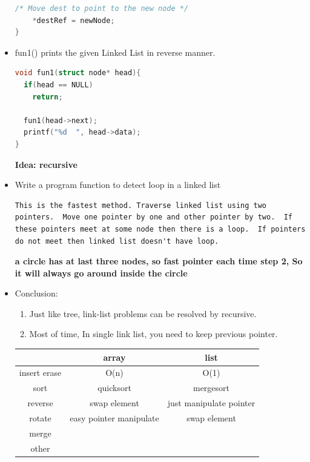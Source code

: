 \documentclass[a4paper,12pt,twoside]{book}
\begin{document}
\begin{itemize}
\begin{lstlisting}[frame=single, language=c++]
    /* Move dest to point to the new node */
    *destRef = newNode;
}
\end{lstlisting}

\item fun1() prints the given Linked List in reverse manner. 
\begin{lstlisting}[frame=single, language=c++]
void fun1(struct node* head){
  if(head == NULL)
    return;
  
  fun1(head->next);
  printf("%d  ", head->data);
}
\end{lstlisting}
\textbf{Idea: recursive}



\item Write a program function to detect loop in a linked list
\begin{lstlisting}[breaklines]
This is the fastest method. Traverse linked list using two pointers.  Move one pointer by one and other pointer by two.  If these pointers meet at some node then there is a loop.  If pointers do not meet then linked list doesn't have loop.
\end{lstlisting}
\textbf{a circle has at last three nodes, so fast pointer each time step 2, So it will always go around inside the circle}

\item Conclusion:
\begin{enumerate}
\item Just like tree, link-list problems can be resolved by recursive. 
\item Most of time, In single link list, you need to keep previous pointer. 
\end{enumerate}

\begin{tabular}{|c|c|c|}
\hline 
 & array & list \\ 
\hline 
insert erase & O(n) & O(1) \\ 
\hline 
sort & quicksort & mergesort  \\ 
\hline 
reverse & swap element & just manipulate pointer  \\ 
\hline 
rotate & easy pointer manipulate & swap element  \\ 
\hline 
merge &  &  \\ 
\hline 
other  &  &  \\ 
\hline 

\end{tabular} 


\end{itemize}
\end{document}
